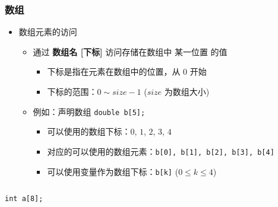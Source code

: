 \begin{frame}[fragile]
    \frametitle{数组}

    \begin{overlayarea}{\textwidth}{.55\textheight}
        \begin{itemize}
            \item 数组元素的访问

                \begin{itemize}
                    \item 通过 \textbf{数组名 [下标]} 访问存储在数组中 某一位置 的值
                        \begin{itemize}
                            \item 下标是指在元素在数组中的位置，从 $0$ 开始
                            \item 下标的范围：$0 \sim size - 1$ ($size$ 为数组大小)
                        \end{itemize}
                \end{itemize}

                \begin{itemize}
                    \item<2-> 例如：声明数组 \lstinline|double b[5];|
                        \begin{itemize}
                            \item 可以使用的数组下标：$0$, $1$, $2$, $3$, $4$
                            \item 对应的可以使用的数组元素：\lstinline|b[0], b[1], b[2], b[3], b[4]|
                            \item 可以使用变量作为数组下标：\lstinline|b[k]| ($0 \le k \le 4$)
                        \end{itemize}
                \end{itemize}
        \end{itemize}
    \end{overlayarea}

    \begin{columns}

        \lstinline|int a[8];|

    \end{columns}
\end{frame}
